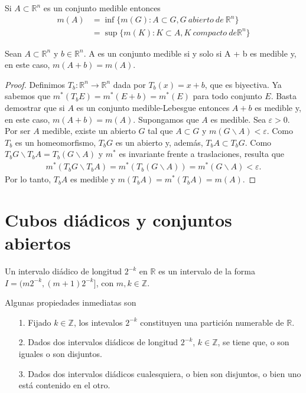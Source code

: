 \begin{teo}
    Si $A \subset \mathbb{R}^n$ es un conjunto medible entonces
    \begin{align*}
        m(A) & = \inf{\{ m(G) : A \subset G, G \ abierto \ de \ \mathbb{R}^n \}} \\
             & = \sup{\{ m(K) : K \subset A, K \ compacto \ de \mathbb{R}^n \}}
    \end{align*}
\end{teo}

\begin{teo}
    Sean $A \subset \mathbb{R}^n$ y $b \in \mathbb{R}^n$. A es un conjunto medible si y solo si A + b es medible y, en este caso, $m(A + b) = m(A)$.
\end{teo}

\begin{proof}
    Definimos $T_b: \mathbb{R}^n \longrightarrow \mathbb{R}^n$ dada por $T_b(x) = x + b$, que es biyectiva. Ya sabemos que $m^*(T_bE) = m^*(E + b) = m^*(E)$ para todo conjunto $E$. Basta demostrar que si $A$ es un conjunto medible-Lebesgue entonces $A + b$ es medible y, en este caso, $m(A + b) = m(A)$. Supongamos que $A$ es medible. Sea $\varepsilon > 0$. Por ser $A$ medible, existe un abierto $G$ tal que $A \subset G$ y $m(G \backslash A) < \varepsilon$. Como $T_b$ es un homeomorfismo, $T_bG$ es un abierto y, además, $T_bA \subset T_bG$. Como $T_bG \backslash T_bA = T_b(G \backslash A)$ y $m^*$ es invariante frente a traslaciones, resulta que
    \begin{align*}
        m^*(T_bG \backslash T_bA) = m^*(T_b(G \backslash A)) = m^*(G \backslash A) < \varepsilon.
    \end{align*}
    Por lo tanto, $T_bA$ es medible y $m(T_bA) = m^*(T_bA) = m(A)$.
\end{proof}

\section{Cubos diádicos y conjuntos abiertos}

\begin{defi}
    Un intervalo diádico de longitud $2^{-k}$ en $\mathbb{R}$ es un intervalo de la forma $I = (m2^{-k}, (m+1)2^{-k}]$, con $m,k \in \mathbb{Z}$.
\end{defi}

\begin{obs}
    Algunas propiedades inmediatas son
    \begin{enumerate}
        \item[1.] Fijado $k \in \mathbb{Z}$, los intevalos $2^{-k}$ constituyen una partición numerable de $\mathbb{R}$.
        \item[2.] Dados dos intervalos diádicos de longitud $2^{-k}$, $k \in \mathbb{Z}$, se tiene que, o son iguales o son disjuntos.
        \item[3.] Dados dos intervalos diádicos cualesquiera, o bien son disjuntos, o bien uno está contenido en el otro.
    \end{enumerate}
\end{obs}

